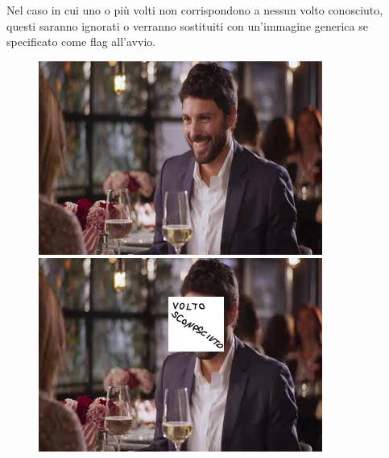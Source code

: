 \documentclass{report}
\begin{document}
Nel caso in cui uno o più volti non corrispondono a nessun volto conosciuto, questi saranno ignorati o verranno sostituiti con un’immagine generica se specificato come flag all’avvio.

\begin{samepage}
    \begin{figure}[!htb]
    \begin{minipage}{0.48\textwidth}
        \centering
        \includegraphics[width=\textwidth]{frame_cena.png}
    \end{minipage}\hfill
    \begin{minipage}{0.48\textwidth}
        \centering
        \includegraphics[width=\textwidth]{frame_cena_sub.png}
    \end{minipage}\hfill
    \end{figure}
\end{samepage}
\end{document}
